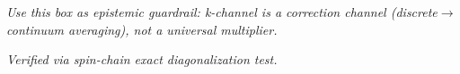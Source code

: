 \begin{tcolorbox}[colback=cyan!5!white, colframe=cyan!50!black,
                  title=\textbf{k-channel Cross-Validation (Independent Analog Test)}]
\vspace{0.3em}
\textit{Use this box as epistemic guardrail: k-channel is a correction channel
(discrete$\to$continuum averaging), not a universal multiplier.}

\vspace{0.2em}
\textit{Verified via spin-chain exact diagonalization test.}

\end{tcolorbox}
